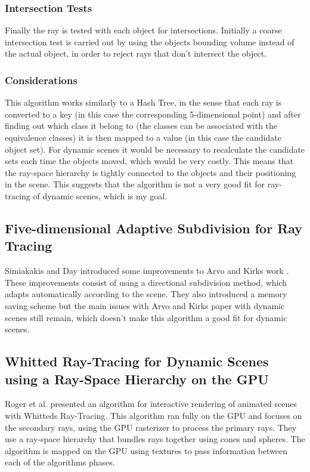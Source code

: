 \documentclass{llncs}
\begin{document}
\subsubsection{Intersection Tests}	

Finally the ray is tested with each object for intersections. Initially a coarse intersection test is carried out by using the objects bounding volume instead of the actual object, in order to reject rays that don't intersect the object.

\subsubsection{Considerations}

This algorithm works similarly to a Hash Tree, in the sense that each ray is converted to a key (in this case the corresponding 5-dimensional point) and after finding out which class it belong to (the classes can be associated with the equivalence classes) it is then mapped to a value (in this case the candidate object set). For dynamic scenes it would be necessary to recalculate the candidate sets each time the objects moved, which would be very costly. This means that the ray-space hierarchy is tightly connected to the objects and their positioning in the scene. This suggests that the algorithm is not a very good fit for ray-tracing of dynamic scenes, which is my goal.

%
\subsection{Five-dimensional Adaptive Subdivision for Ray Tracing}
%

Simiakakis and Day \cite{SimiakisDay94} introduced some improvements to Arvo and Kirks work \cite{ArvoKirk87}. These improvements consist of using a directional subdivision method, which adapts automatically according to the scene. They also introduced a memory saving scheme but the main issues with Arvo and Kirks paper with dynamic scenes still remain, which doesn't make this algorithm a good fit for dynamic scenes.

%
\subsection{Whitted Ray-Tracing for Dynamic Scenes using a Ray-Space Hierarchy on the GPU}
%

Roger et al. \cite{Roger07} presented an algorithm for interactive rendering of animated scenes with Whitteds Ray-Tracing. This algorithm ran fully on the GPU and focuses on the secondary rays, using the GPU rasterizer to process the primary rays. They use a ray-space hierarchy that bundles rays together using cones and spheres. The algorithm is mapped on the GPU using textures to pass information between each of the algorithms phases.
\end{document}
